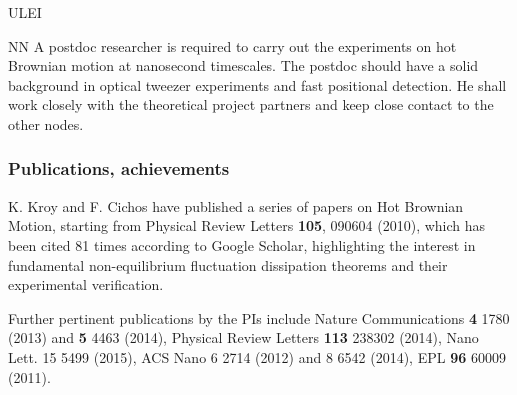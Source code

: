 \begin{sitedescription}{ULEI}
\begin{participant}[type=res,PM=36,salary=5500]{NN}
A postdoc researcher is required to carry out the experiments on hot Brownian motion at nanosecond timescales. The postdoc should have a solid background in optical tweezer experiments and fast positional detection. He shall work closely with the theoretical project partners and keep close contact to the other nodes.
\end{participant}

\subsubsection*{Publications, achievements}

\begin{compactenum}
\item K. Kroy and F. Cichos have published a series of papers on Hot Brownian Motion, starting from Physical Review Letters
{\bf 105},  090604 (2010), which has been cited 81 times according to Google Scholar, highlighting the interest in
fundamental non-equilibrium fluctuation dissipation theorems and their experimental verification.

\item Further pertinent publications by the PIs include Nature Communications {\bf 4} 1780 (2013) and {\bf 5} 4463 (2014),
Physical Review Letters {\bf 113} 238302 (2014), Nano Lett. 15 5499 (2015), ACS Nano 6 2714 (2012) and 8 6542 (2014), 
EPL {\bf 96} 60009 (2011).







\end{compactenum}
\end{sitedescription}
